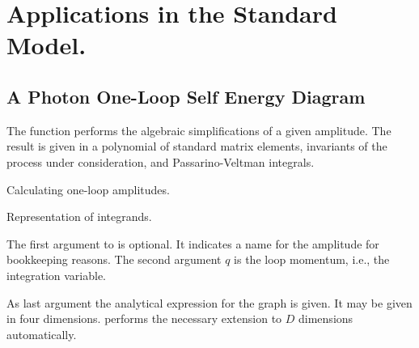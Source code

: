\section{Applications in the Standard Model.}

\subsection{A Photon One-Loop Self Energy Diagram}
\label{self}
The function  performs the algebraic simplifications 
of a given amplitude. The result is given in a polynomial of standard 
matrix elements, invariants of the process under consideration, 
and Passarino-Veltman integrals.

 {Calculating one-loop amplitudes.}

 {Representation of integrands.}

The first argument to  is optional. It indicates  a name
for the amplitude for bookkeeping reasons. 
The second argument $q$ is the loop momentum, i.e., the integration 
variable. 

As last argument the analytical expression for the graph is given.      
It may be given in four dimensions.  performs the 
necessary extension to $D$ dimensions automatically. 

